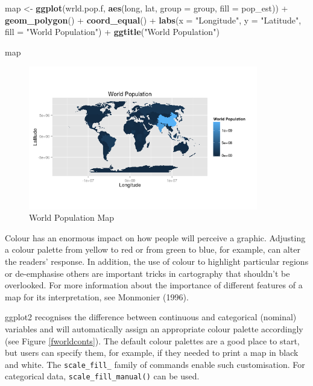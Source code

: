 \documentclass[]{article}
\newenvironment{Shaded}{}{}
\newcommand{\KeywordTok}[1]{\textcolor[rgb]{0.00,0.44,0.13}{\textbf{{#1}}}}
\newcommand{\DataTypeTok}[1]{\textcolor[rgb]{0.56,0.13,0.00}{{#1}}}
\newcommand{\StringTok}[1]{\textcolor[rgb]{0.25,0.44,0.63}{{#1}}}
\newcommand{\NormalTok}[1]{{#1}}
\let\Oldincludegraphics\includegraphics
\renewcommand{\includegraphics}[1]{\Oldincludegraphics[width=10cm]{#1}}
\begin{document}
\begin{Shaded}
\begin{Highlighting}[]
\NormalTok{map <- }\KeywordTok{ggplot}\NormalTok{(wrld.pop.f, }\KeywordTok{aes}\NormalTok{(long, lat, }\DataTypeTok{group =} \NormalTok{group, }\DataTypeTok{fill =} \NormalTok{pop_est)) + }\KeywordTok{geom_polygon}\NormalTok{() + }
    \KeywordTok{coord_equal}\NormalTok{() + }\KeywordTok{labs}\NormalTok{(}\DataTypeTok{x =} \StringTok{"Longitude"}\NormalTok{, }\DataTypeTok{y =} \StringTok{"Latitude"}\NormalTok{, }\DataTypeTok{fill =} \StringTok{"World Population"}\NormalTok{) + }
    \KeywordTok{ggtitle}\NormalTok{(}\StringTok{"World Population"}\NormalTok{)}

\NormalTok{map}
\end{Highlighting}
\end{Shaded}
\begin{figure}[htbp]
\centering
\includegraphics{figure/World_Population_Map.png}
\caption{World Population Map} \label{fworldpop}
\end{figure}

Colour has an enormous impact on how people will perceive a graphic.
Adjusting a colour palette from yellow to red or from green to blue, for
example, can alter the readers' response. In addition, the use of colour
to highlight particular regions or de-emphasise others are important
tricks in cartography that shouldn't be overlooked. For more
information about the importance of different features of a map for its
interpretation, see Monmonier (1996).

ggplot2 recognises the difference between continuous and categorical
(nominal) variables and will automatically assign an appropriate colour
palette accordingly (see Figure \ref{fworldconts}). The default colour palettes are a
good place to start, but users can specify them, for example, if they needed to print a  map in black and white. The
\texttt{scale\_fill\_} family of commands enable such customisation. For
categorical data, \texttt{scale\_fill\_manual()} can be used.
\end{document}
